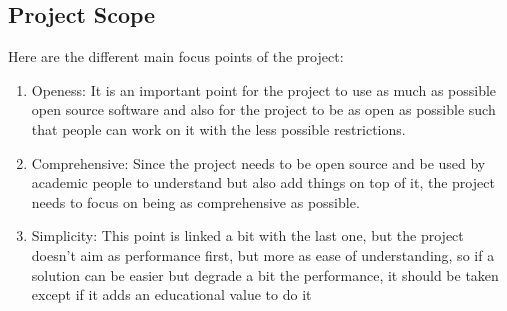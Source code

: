 \subsection{Project Scope}
Here are the different main focus points of the project:


\begin{enumerate}[label={\textbullet}]
    \item Openess: It is an important point for the project to use as much as possible
    open source software and also for the project to be as open as possible such that people 
    can work on it with the less possible restrictions.
    \item Comprehensive: Since the project needs to be open source and be used by academic people
    to understand but also add things on top of it, the project needs to focus on being as comprehensive 
    as possible.
    \item Simplicity: This point is linked a bit with the last one, but the project doesn't aim as 
    performance first, but more as ease of understanding, so if a solution can be easier but degrade 
    a bit the performance, it should be taken except if it adds an educational value to do it
\end{enumerate}